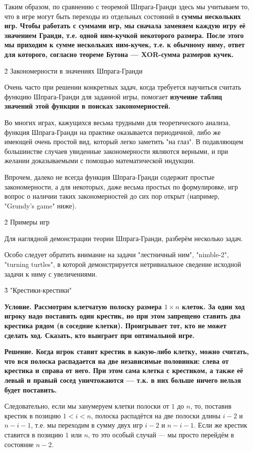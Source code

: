 Таким образом, по сравнению с теоремой Шпрага-Гранди здесь мы учитываем то, что в игре могут быть переходы из отдельных состояний в \bf{суммы нескольких игр}. Чтобы работать с суммами игр, мы сначала заменяем каждую игру её значением Гранди, т.е. одной ним-кучкой некоторого размера. После этого мы приходим к сумме нескольких ним-кучек, т.е. к обычному ниму, ответ для которого, согласно теореме Бутона --- XOR-сумма размеров кучек.


\h2{ Закономерности в значениях Шпрага-Гранди }

Очень часто при решении конкретных задач, когда требуется научиться считать функцию Шпрага-Гранди для заданной игры, помогает \bf{изучение таблиц значений} этой функции в поисках закономерностей.

Во многих играх, кажущихся весьма трудными для теоретического анализа, функция Шпрага-Гранди на практике оказывается периодичной, либо же имеющей очень простой вид, который легко заметить "на глаз". В подавляющем большинстве случаев увиденные закономерности являются верными, и при желании доказываемыми с помощью математической индукции.

Впрочем, далеко не всегда функция Шпрага-Гранди содержит простые закономерности, а для некоторых, даже весьма простых по формулировке, игр вопрос о наличии таких закономерностей до сих пор открыт (например, "Grundy's game" ниже).


\h2{ Примеры игр }

Для наглядной демонстрации теории Шпрага-Гранди, разберём несколько задач.

Особо следует обратить внимание на задачи "лестничный ним", "nimble-2", "turning turtles", в которой демонстрируется нетривиальное сведение исходной задачи к ниму с увеличениями.


\h3{ "Крестики-крестики" }

\bf{Условие}. Рассмотрим клетчатую полоску размера $1 \times n$ клеток. За один ход игроку надо поставить один крестик, но при этом запрещено ставить два крестика рядом (в соседние клетки). Проигрывает тот, кто не может сделать ход. Сказать, кто выиграет при оптимальной игре.

\bf{Решение}. Когда игрок ставит крестик в какую-либо клетку, можно считать, что вся полоска распадается на две независимые половинки: слева от крестика и справа от него. При этом сама клетка с крестиком, а также её левый и правый сосед уничтожаются --- т.к. в них больше ничего нельзя будет поставить.

Следовательно, если мы занумеруем клетки полоски от $1$ до $n$, то, поставив крестик в позицию $1 < i < n$, полоска распадётся на две полоски длины $i-2$ и $n-i-1$, т.е. мы переходим в сумму двух игр $i-2$ и $n-i-1$. Если же крестик ставится в позицию $1$ или $n$, то это особый случай --- мы просто перейдём в состояние $n-2$.

